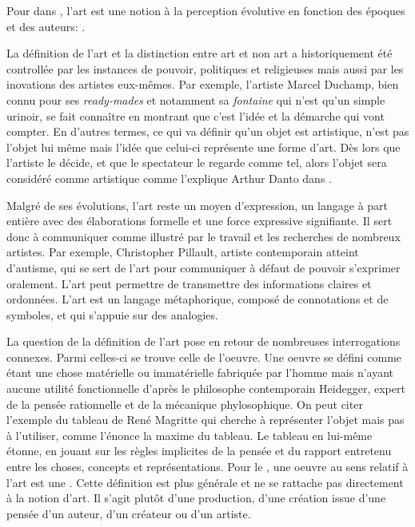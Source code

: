 \documentclass[12pt]{article} %
\begin{document}
Pour \citeauthor{SDavies1991} dans , l'art est une notion à la perception évolutive en fonction des époques et des auteurs:  \cite{SDavies1991}. 

La définition de l'art et la distinction entre art et non art a historiquement été controllée par les instances de pouvoir, politiques et religieuses mais aussi par les inovations des artistes eux-mêmes. Par exemple, l'artiste Marcel Duchamp, bien connu pour ses \textit{ready-mades} et notamment sa \textit{fontaine} qui n'est qu'un simple urinoir, se fait connaître en montrant que c'est l'idée et la démarche qui vont compter. En d'autres termes, ce qui va définir qu'un objet est artistique, n'est pas l'objet lui même mais l'idée que celui-ci représente une forme d'art. Dès lors que l'artiste le décide, et que le spectateur le regarde comme tel, alors l'objet sera considéré comme artistique comme l'explique Arthur Danto dans  \cite{ADanto1989}. 

Malgré de ses évolutions, l'art reste un moyen d'expression, un langage à part entière avec des élaborations formelle et une force expressive signifiante. Il sert donc à communiquer comme illustré par le travail et les recherches de nombreux artistes. Par exemple, Christopher Pillault, artiste contemporain atteint d'autisme, qui se sert de l'art pour communiquer à défaut de pouvoir s'exprimer oralement. L'art peut permettre de transmettre des informations claires et ordonnées. L'art est un langage métaphorique, composé de connotations et de symboles, et qui s'appuie sur des analogies. 

La question de la définition de l'art pose en retour de nombreuses interrogations connexes. Parmi celles-ci se trouve celle de l'oeuvre. Une oeuvre se défini comme étant une chose matérielle ou immatérielle fabriquée par l'homme mais n'ayant aucune utilité fonctionnelle d'après le philosophe contemporain Heidegger, expert de la pensée rationnelle et de la mécanique phylosophique. On peut citer l'exemple du tableau de René Magritte  qui cherche à représenter l'objet mais pas à l'utiliser, comme l'énonce la maxime  du tableau\cite{RMAgritte1929}. Le tableau en lui-même étonne, en jouant sur les règles implicites de la pensée et du rapport entretenu entre les choses, concepts et représentations. Pour le , une oeuvre au sens relatif à l'art est une  \cite{LarousseOnline-oeuvre}. Cette définition est plus générale et ne se rattache pas directement à la notion d'art. Il s'agit plutôt d'une production, d'une création issue d'une pensée d'un auteur, d'un créateur ou d'un artiste.  
\end{document}
